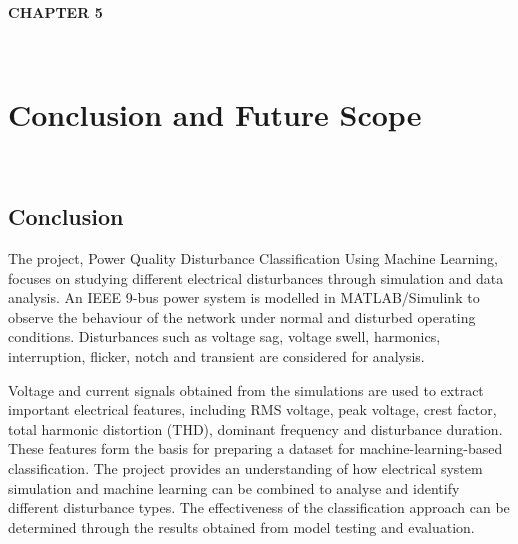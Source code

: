 \documentclass[12pt]{article}
\begin{document}
\begin{center}
\begin{enumerate}
\clearpage



\begin{center}
    \vspace{2cm}
    \textbf{\LARGE CHAPTER 5}\\[1cm]
\end{center}\\



\section{Conclusion and Future Scope}\\
\subsection{Conclusion}
\raggedright
\justifying
The project, Power Quality Disturbance Classification Using Machine Learning, focuses on studying different electrical disturbances through simulation and data analysis. An IEEE 9-bus power system is modelled in MATLAB/Simulink to observe the behaviour of the network under normal and disturbed operating conditions. Disturbances such as voltage sag, voltage swell, harmonics, interruption, flicker, notch and transient are considered for analysis.

Voltage and current signals obtained from the simulations are used to extract important electrical features, including RMS voltage, peak voltage, crest factor, total harmonic distortion (THD), dominant frequency and disturbance duration. These features form the basis for preparing a dataset for machine-learning-based classification. The project provides an understanding of how electrical system simulation and machine learning can be combined to analyse and identify different disturbance types. The effectiveness of the classification approach can be determined through the results obtained from model testing and evaluation.


\end{enumerate}
\end{center}
\end{document}
